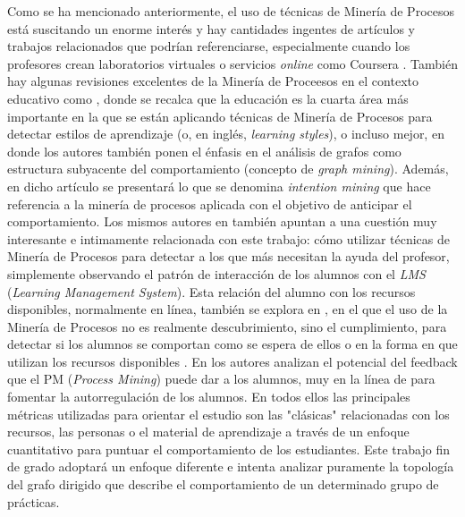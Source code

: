 Como se ha mencionado anteriormente, el uso de técnicas de Minería de Procesos está suscitando un enorme interés y hay cantidades ingentes de artículos y trabajos relacionados que podrían referenciarse, especialmente cuando los profesores crean laboratorios virtuales \cite{Elmoazen_2023} o servicios \emph{online} como Coursera \cite{mukala2015learning}. También hay algunas revisiones excelentes de la Minería de Proceesos en el contexto educativo como \cite{dos2019process}, donde se recalca que la educación es la cuarta área más importante en la que se están aplicando técnicas de Minería de Procesos para detectar estilos de aprendizaje (o, en inglés, \emph{learning styles}), o incluso mejor, en \cite{bogarin2018survey} donde los autores también ponen el énfasis en el análisis de grafos como estructura subyacente del comportamiento (concepto de \emph{graph mining}). Además, en dicho artículo se presentará lo que se denomina \emph{intention mining} que hace referencia a la minería de procesos aplicada con el objetivo de anticipar el comportamiento. Los mismos autores en \cite{bogarin2018discovering} también apuntan a una cuestión muy interesante e intimamente relacionada con este trabajo: cómo utilizar técnicas de Minería de Procesos para detectar a los que más necesitan la ayuda del profesor, simplemente observando el patrón de interacción de los alumnos con el \emph{LMS} (\emph{Learning Management System}). Esta relación del alumno con los recursos disponibles, normalmente en línea, también se explora en \cite{mukala2015learning}, en el que el uso de la Minería de Procesos no es realmente descubrimiento, sino el cumplimiento, para detectar si los alumnos se comportan como se espera de ellos o en la forma en que utilizan los recursos disponibles \cite{juhavnak2019using}. En \cite{sedrakyan2016process} los autores analizan el potencial del
feedback que el PM (\emph{Process Mining}) puede dar a los alumnos, muy en la línea de \citep{Keller_1968} para fomentar la autorregulación de los alumnos. En todos ellos las principales métricas utilizadas para orientar el estudio son las "clásicas" relacionadas con los recursos, las personas o el material de aprendizaje a través de un enfoque cuantitativo para puntuar el comportamiento de los estudiantes. Este trabajo fin de grado adoptará un enfoque diferente e intenta analizar puramente la topología del grafo dirigido que describe el comportamiento de un determinado grupo de prácticas.